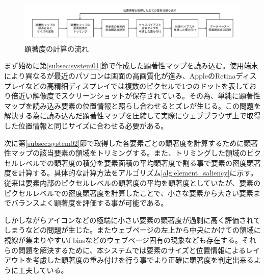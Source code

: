 \begin{figure}[H]
    \centering
    \includegraphics[width=12cm]{figures/06_process03.jpg}
    \caption{顕著度の計算の流れ}
    \label{fig_system03}
\end{figure}

\par まず始めに第\ref{subsec:system01}節で作成した顕著性マップを読み込む。使用端末により異なるが最近のパソコンは画面の高画質化が進み、AppleのRetinaディスプレイなどの高精細ディスプレイでは複数のピクセルで1つのドットを表しており倍近い解像度でスクリーンショットが保存されている。その為、単純に顕著性マップを読み込み要素の位置情報と照らし合わせるとズレが生じる。この問題を解決する為に読み込んだ顕著性マップを圧縮して実際にウェブブラウザ上で取得した位置情報と同じサイズに合わせる必要がある。

\par 次に第\ref{subsec:system02}節で取得した各要素ごとの顕著度を計算するために顕著性マップの該当要素の領域をトリミングする。また、トリミングした領域のピクセルレベルでの顕著度の積分を要素面積の平均顕著度で割る事で要素の密度顕著度を計算する。具体的な計算方法をアルゴリズム\ref{alg:element_saliency}に示す。従来は要素内部のピクセルレベルの顕著度の平均を顕著度としていたが、要素のピクセルレベルでの密度顕著度を計算したことで、小さな要素から大きい要素までバランスよく顕著度を評価する事が可能である。

\par しかしながらアイコンなどの極端に小さい要素の顕著度が過剰に高く評価されてしまうなどの問題が生じた。またウェブページの左上から中央にかけての領域に視線が集まりやすいf-biasなどのウェブページ固有の現象なども存在する。それらの問題を解決するために、本システムでは要素のサイズと位置情報によるレイアウトを考慮した顕著度の重み付けを行う事でより正確に顕著度を判定出来るように工夫している。

